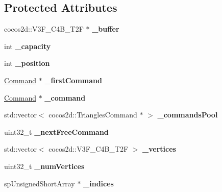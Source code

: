 \subsection*{Protected Attributes}
\begin{DoxyCompactItemize}
\item 
\mbox{\label{classspine_1_1SkeletonBatch_a72310ed66da821152bcfd2d4b4bc68e9}} 
cocos2d\+::\+V3\+F\+\_\+\+C4\+B\+\_\+\+T2F $\ast$ {\bfseries \+\_\+buffer}
\item 
\mbox{\label{classspine_1_1SkeletonBatch_adf814c83e1589591075f17927ee03c1d}} 
int {\bfseries \+\_\+capacity}
\item 
\mbox{\label{classspine_1_1SkeletonBatch_a8f40b0a6e27f666ae07558cdecf0c315}} 
int {\bfseries \+\_\+position}
\item 
\mbox{\label{classspine_1_1SkeletonBatch_a6fef0f9401a11dd134828c452cbcab76}} 
\hyperlink{classspine_1_1SkeletonBatch_1_1Command}{Command} $\ast$ {\bfseries \+\_\+first\+Command}
\item 
\mbox{\label{classspine_1_1SkeletonBatch_a1198ffbe8eb1026b69bc03783d034294}} 
\hyperlink{classspine_1_1SkeletonBatch_1_1Command}{Command} $\ast$ {\bfseries \+\_\+command}
\item 
\mbox{\label{classspine_1_1SkeletonBatch_a5ea0dcc5a0d80a63e3c3bb1649a4ca2a}} 
std\+::vector$<$ cocos2d\+::\+Triangles\+Command $\ast$ $>$ {\bfseries \+\_\+commands\+Pool}
\item 
\mbox{\label{classspine_1_1SkeletonBatch_a33f8f87fb021da69c3a3fabf2ab28f01}} 
uint32\+\_\+t {\bfseries \+\_\+next\+Free\+Command}
\item 
\mbox{\label{classspine_1_1SkeletonBatch_a3dbba1b774d4eba0c3544d31e8bd1903}} 
std\+::vector$<$ cocos2d\+::\+V3\+F\+\_\+\+C4\+B\+\_\+\+T2F $>$ {\bfseries \+\_\+vertices}
\item 
\mbox{\label{classspine_1_1SkeletonBatch_a695402ecd35ca7df442a296dc9337483}} 
uint32\+\_\+t {\bfseries \+\_\+num\+Vertices}
\item 
\mbox{\label{classspine_1_1SkeletonBatch_a36e8c4799785d7599908124c0975f9c9}} 
sp\+Unsigned\+Short\+Array $\ast$ {\bfseries \+\_\+indices}
\end{DoxyCompactItemize}


